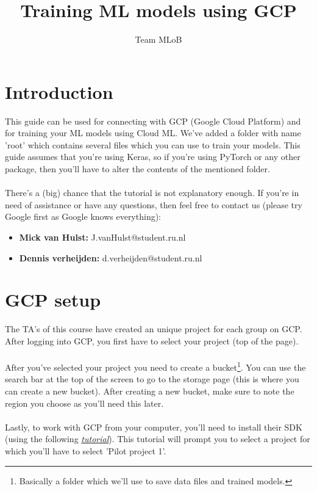 \documentclass{article}
\title{}
\title{Training ML models using GCP}
\author{Team MLoB}
\begin{document}
\maketitle

\section{Introduction}
This guide can be used for connecting with GCP (Google Cloud Platform) and for training your ML models using Cloud ML. We've added a folder with name 'root' which contains several files which you can use to train your models. This guide assumes that you're using Keras, so if you're using PyTorch or any other package, then you'll have to alter the contents of the mentioned folder.
\\
\\
There's a (big) chance that the tutorial is not explanatory enough. If you're in need of assistance or have any questions, then feel free to contact us (please try Google first as Google knows everything):
\begin{itemize}
	\item \textbf{Mick van Hulst:} J.vanHulst@student.ru.nl 
	\item \textbf{Dennis verheijden:} d.verheijden@student.ru.nl
\end{itemize}

\section{GCP setup}
The TA's of this course have created an unique project for each group on GCP. After logging into GCP, you first have to select your project (top of the page).
\\
\\
After you've selected your project you need to create a bucket\footnote{Basically a folder which we'll use to save data files and trained models.}. You can use the search bar at the top of the screen to go to the storage page (this is where you can create a new bucket). After creating a new bucket, make sure to note the region you choose as you'll need this later.
\\
\\
Lastly, to work with GCP from your computer, you'll need to install their SDK (using the following \textit{\href{https://cloud.google.com/sdk/docs/}{tutorial}}). This tutorial will prompt you to select a project for which you'll have to select 'Pilot project 1'.
\end{document}
